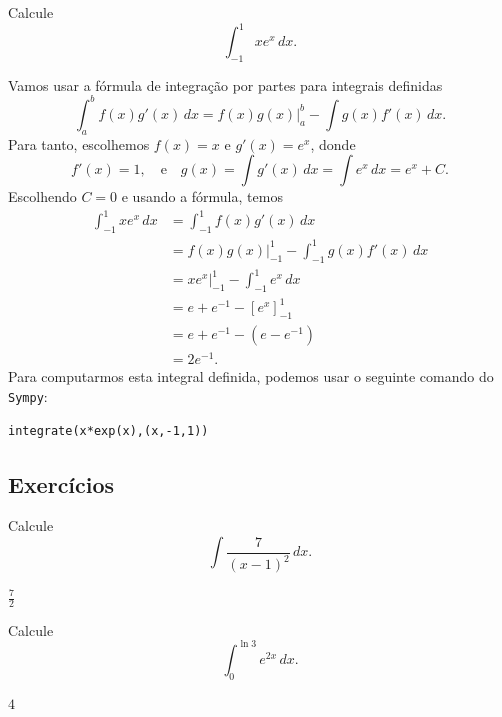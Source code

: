 \begin{exeresol}
  Calcule
  \begin{equation}
    \int_{-1}^1 xe^x\,dx.
  \end{equation}
\end{exeresol}
\begin{resol}
  Vamos usar a fórmula de integração por partes para integrais definidas
  \begin{equation}
    \int_a^b f(x)g'(x)\,dx = f(x)g(x)|_{a}^b - \int g(x)f'(x)\,dx.
  \end{equation}
  Para tanto, escolhemos $f(x) = x$ e $g'(x) = e^x$, donde
  \begin{equation}
    f'(x) = 1,\quad\text{e}\quad g(x) = \int g'(x)\,dx = \int e^x\,dx = e^x + C.
  \end{equation}
  Escolhendo $C=0$ e usando a fórmula, temos
  \begin{align}
    \int_{-1}^1 xe^x\,dx &= \int_{-1}^1 f(x)g'(x)\,dx\\
                         &= f(x)g(x)|_{-1}^1 - \int_{-1}^1 g(x)f'(x)\,dx\\
                         &= xe^x|_{-1}^1 - \int_{-1}^1 e^x\,dx\\
                         &= e+e^{-1}-[e^x]_{-1}^1\\
                         &= e+e^{-1}-(e-e^{-1})\\
                         &= 2e^{-1}.
  \end{align}
  \ifispython
  Para computarmos esta integral definida, podemos usar o seguinte comando do \verb+Sympy+:
\begin{verbatim}
integrate(x*exp(x),(x,-1,1))
\end{verbatim}
  \fi
\end{resol}

\emconstrucao

\subsection*{Exercícios}

\begin{exer}
  Calcule
  \begin{equation}
    \int \frac{7}{(x-1)^2}\,dx.
  \end{equation}
\end{exer}
\begin{resp}
  $\frac{7}{2}$
\end{resp}

\begin{exer}
  Calcule
  \begin{equation}
    \int_0^{\ln 3} e^{2x}\,dx.
  \end{equation}
\end{exer}
\begin{resp}
  $4$
\end{resp}

